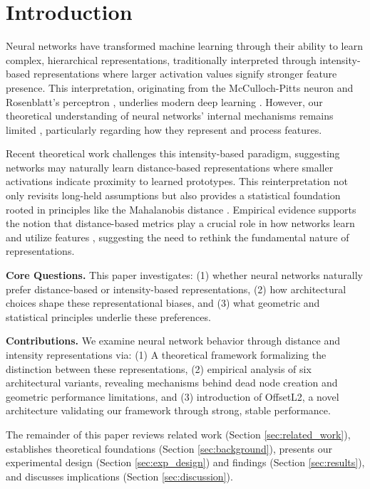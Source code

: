 \section{Introduction}
\label{sec:introduction}

Neural networks have transformed machine learning through their ability to learn complex, hierarchical representations, traditionally interpreted through intensity-based representations where larger activation values signify stronger feature presence. This interpretation, originating from the McCulloch-Pitts neuron \cite{mcculloch1943logical} and Rosenblatt's perceptron \cite{rosenblatt1958perceptron}, underlies modern deep learning \cite{lecun2015deep}. However, our theoretical understanding of neural networks' internal mechanisms remains limited \cite{lipton2018mythos, montavon2018methods}, particularly regarding how they represent and process features.

Recent theoretical work challenges this intensity-based paradigm, suggesting networks may naturally learn distance-based representations \cite{oursland2024interpreting} where smaller activations indicate proximity to learned prototypes. This reinterpretation not only revisits long-held assumptions but also provides a statistical foundation rooted in principles like the Mahalanobis distance \cite{mahalanobis1936generalized, mclachlan2019mahalanobis}. Empirical evidence supports the notion that distance-based metrics play a crucial role in how networks learn and utilize features \cite{oursland2024neural}, suggesting the need to rethink the fundamental nature of representations.

\textbf{Core Questions.} This paper investigates: (1) whether neural networks naturally prefer distance-based or intensity-based representations, (2) how architectural choices shape these representational biases, and (3) what geometric and statistical principles underlie these preferences.

\textbf{Contributions.} We examine neural network behavior through distance and intensity representations via: (1) A theoretical framework formalizing the distinction between these representations, (2) empirical analysis of six architectural variants, revealing mechanisms behind dead node creation and geometric performance limitations, and (3) introduction of OffsetL2, a novel architecture validating our framework through strong, stable performance.

The remainder of this paper reviews related work (Section \ref{sec:related_work}), establishes theoretical foundations (Section \ref{sec:background}), presents our experimental design (Section \ref{sec:exp_design}) and findings (Section \ref{sec:results}), and discusses implications (Section \ref{sec:discussion}).